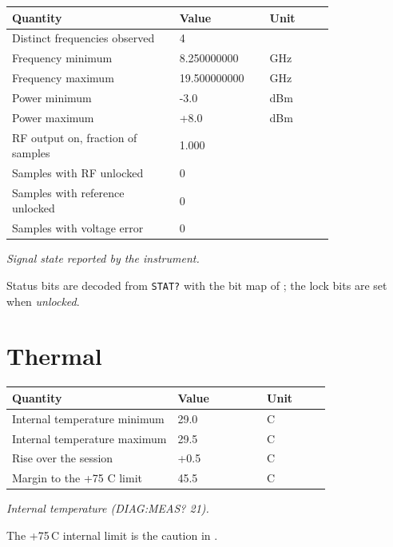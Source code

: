 \documentclass[11pt]{article}
\begin{document}
\begin{center}
\begin{tabular}{@{}p{0.52\linewidth}p{0.28\linewidth}l@{}}
\toprule
\textbf{Quantity} & \textbf{Value} & \textbf{Unit} \\
\midrule
Distinct frequencies observed & 4 &  \\
Frequency minimum & 8.250000000 & GHz \\
Frequency maximum & 19.500000000 & GHz \\
Power minimum & -3.0 & dBm \\
Power maximum & +8.0 & dBm \\
RF output on, fraction of samples & 1.000 &  \\
Samples with RF unlocked & 0 &  \\
Samples with reference unlocked & 0 &  \\
Samples with voltage error & 0 &  \\
\bottomrule
\end{tabular}

\emph{Signal state reported by the instrument.}
\end{center}

Status bits are decoded from \texttt{STAT?} with the bit map of
\cite[Table 5]{nicomms}; the lock bits are set when \emph{unlocked}.

\section{Thermal}

\begin{center}
\begin{tabular}{@{}p{0.52\linewidth}p{0.28\linewidth}l@{}}
\toprule
\textbf{Quantity} & \textbf{Value} & \textbf{Unit} \\
\midrule
Internal temperature minimum & 29.0 & \textdegree{}C \\
Internal temperature maximum & 29.5 & \textdegree{}C \\
Rise over the session & +0.5 & \textdegree{}C \\
Margin to the +75 \textdegree{}C limit & 45.5 & \textdegree{}C \\
\bottomrule
\end{tabular}

\emph{Internal temperature (DIAG:MEAS? 21).}
\end{center}

The +75\,\textdegree{}C internal limit is the caution in \cite{niguide}.
\end{document}
